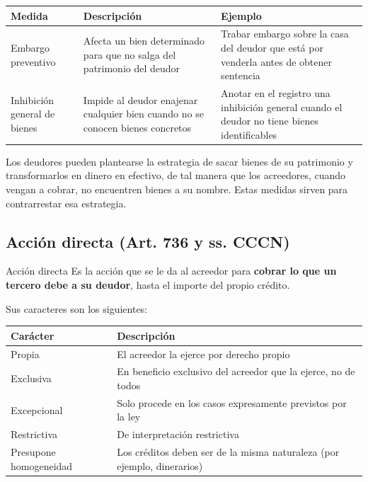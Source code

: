 \documentclass[12pt,oneside]{book}
\newenvironment{tabla}{%
    \par\medskip\begingroup\small\renewcommand{\arraystretch}{1.3}\noindent\ignorespaces
}{%
    \par\endgroup\medskip
}
\begin{document}
\begin{tabla}
\begin{tabularx}{\textwidth}{B{3.4cm}YY}
\toprule
Medida & \textbf{Descripción} & \textbf{Ejemplo} \\
\midrule
Embargo preventivo & Afecta un bien determinado para que no salga del patrimonio del deudor & Trabar embargo sobre la casa del deudor que está por venderla antes de obtener sentencia \\
Inhibición general de bienes & Impide al deudor enajenar cualquier bien cuando no se conocen bienes concretos & Anotar en el registro una inhibición general cuando el deudor no tiene bienes identificables \\
\bottomrule
\end{tabularx}
\end{tabla}

Los deudores pueden plantearse la estrategia de sacar bienes de su patrimonio y transformarlos en dinero en efectivo, de tal manera que los acreedores, cuando vengan a cobrar, no encuentren bienes a su nombre. Estas medidas sirven para contrarrestar esa estrategia.

\subsection{Acción directa (Art. 736 y ss. CCCN)}

\begin{definition}{Acción directa}
Es la acción que se le da al acreedor para \textbf{cobrar lo que un tercero debe a su deudor}, hasta el importe del propio crédito.
\end{definition}

Sus caracteres son los siguientes:

\begin{tabla}
\begin{tabularx}{\textwidth}{B{3.6cm}Y}
\toprule
Carácter & \textbf{Descripción} \\
\midrule
Propia & El acreedor la ejerce por derecho propio \\
Exclusiva & En beneficio exclusivo del acreedor que la ejerce, no de todos \\
Excepcional & Solo procede en los casos expresamente previstos por la ley \\
Restrictiva & De interpretación restrictiva \\
Presupone homogeneidad & Los créditos deben ser de la misma naturaleza (por ejemplo, dinerarios) \\
\bottomrule
\end{tabularx}
\end{tabla}
\end{document}
